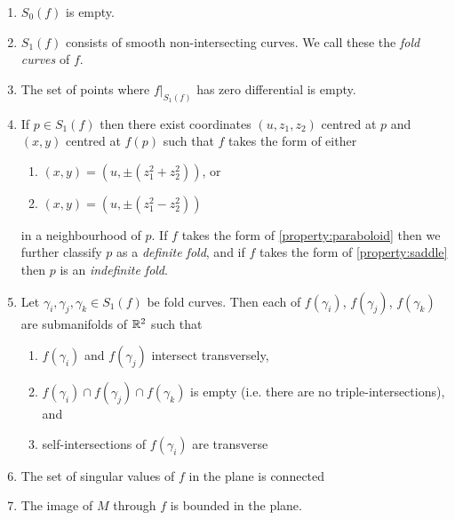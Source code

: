 \begin{enumerate}
	\item $S_0(f)$ is empty.
	
	\item $S_1(f)$ consists of smooth non-intersecting curves.  We call these the \emph{fold curves} of $f$.
	
	\item The set of points where $f|_{S_1(f)}$ has zero differential is empty.
	
	\item\label{strat-con:fold-type} If $p\in S_1(f)$ then there exist coordinates $(u, z_1, z_2)$ centred at $p$ and $(x,y)$ centred at $f(p)$ such that $f$ takes the form of either
	\begin{enumerate}
		\item\label{property:paraboloid} $(x,y)=(u,\pm(z_1^2+z_2^2))$, or
		\item\label{property:saddle} $(x,y)=(u,\pm(z_1^2-z_2^2))$
	\end{enumerate}
	in a neighbourhood of $p$.
	If $f$ takes the form of \ref{property:paraboloid} then we further classify $p$ as a \emph{definite fold}, and if $f$ takes the form of \ref{property:saddle} then $p$ is an \emph{indefinite fold}.
	
	\item Let $\gamma_i, \gamma_j, \gamma_k \in S_1(f)$ be fold curves. Then each of $f(\gamma_i)$, $f(\gamma_j)$, $f(\gamma_k)$ are submanifolds of $\mathbb{R}^2$ such that
	\begin{enumerate}
		\item $f(\gamma_i)$ and $f(\gamma_j)$ intersect transversely,
		
		\item $f(\gamma_i)\cap f(\gamma_j)\cap f(\gamma_k)$ is empty (i.e. there are no triple-intersections), and
		
		\item self-intersections of $f(\gamma_i)$ are transverse
	\end{enumerate}
	
	\item The set of singular values of $f$ in the plane is connected
	
	\item The image of $M$ through $f$ is bounded in the plane.
	
\end{enumerate}


